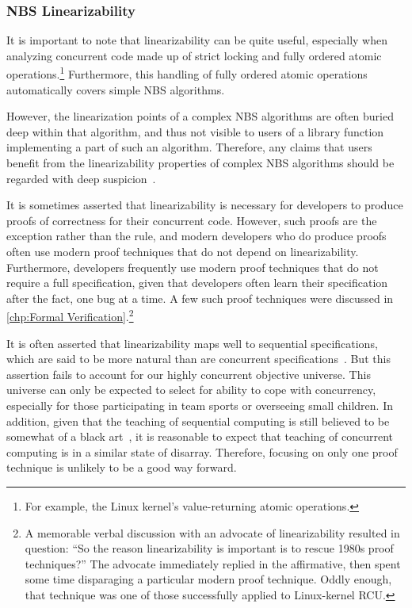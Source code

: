 \subsubsection{NBS Linearizability}
\label{sec:advsync:NBS Linearizability}

It is important to note that linearizability can be quite useful,
especially when analyzing concurrent code made up of strict locking
and fully ordered atomic operations.\footnote{
	For example, the Linux kernel's value-returning atomic operations.}
Furthermore, this handling of fully ordered atomic operations
automatically covers simple NBS algorithms.

However, the linearization points of a complex NBS algorithms are often
buried deep within that algorithm, and thus not visible to users of
a library function implementing a part of such an algorithm.
Therefore, any claims that users benefit from the linearizability properties
of complex NBS algorithms should be regarded with deep
suspicion~\cite{AndreasHaas2012FIFOisnt}.

It is sometimes asserted that linearizability is necessary for developers
to produce proofs of correctness for their concurrent code.
However, such proofs are the exception rather than the rule, and modern
developers who do produce proofs often use modern proof techniques that
do not depend on linearizability.
Furthermore, developers frequently use modern proof techniques that do
not require a full specification, given that developers often learn
their specification after the fact, one bug at a time.
A few such proof techniques were discussed in
\cref{chp:Formal Verification}.\footnote{
	A memorable verbal discussion with an advocate of linearizability
	resulted in question:
	``So the reason linearizability is important is to rescue 1980s
	proof techniques?''
	The advocate immediately replied in the affirmative, then spent
	some time disparaging a particular modern proof technique.
	Oddly enough, that technique was one of those successfully
	applied to Linux-kernel RCU\@.}

It is often asserted that linearizability maps well to sequential
specifications, which are said to be more natural than are concurrent
specifications~\cite{SergioRajsbaum2020HistoryLinearizability}.
But this assertion fails to account for our highly concurrent objective
universe.
This universe can only be expected to select for ability to cope with
concurrency, especially for those participating in team sports or
overseeing small children.
In addition, given that the teaching of sequential
computing is still believed to be somewhat of a black
art~\cite{ElizabethPatitsas2020GradesNotBimodal}, it is reasonable
to expect that teaching of concurrent computing is in a similar state
of disarray.
Therefore, focusing on only one proof technique is unlikely to be a
good way forward.

